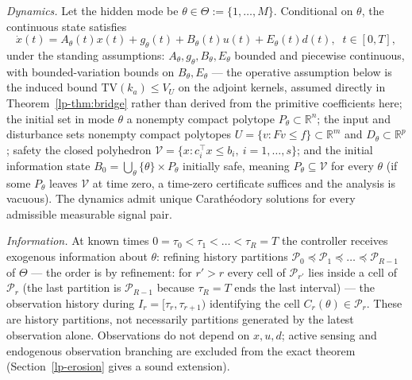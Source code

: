 \documentclass[10pt,twocolumn]{article}
\theoremstyle{plain}
\theoremstyle{definition}
\theoremstyle{remark}
\begin{document}
\emph{Dynamics.} Let the hidden mode be
\(\theta \in \Theta := \{1,\dots,M\}\). Conditional on \(\theta\), the
continuous state satisfies
\[
\dot x(t) = A_\theta(t)x(t) + g_\theta(t) + B_\theta(t)u(t) + E_\theta(t)d(t),
\;\; t \in [0,T],
\]
under the standing assumptions: \(A_\theta, g_\theta, B_\theta, E_\theta\)
bounded and piecewise continuous, with bounded-variation bounds on
\(B_\theta, E_\theta\) --- the operative assumption below is the induced
bound \(\mathrm{TV}(k_a) \le V_U\) on the adjoint kernels, assumed
directly in Theorem~\ref{lp-thm:bridge} rather than derived from the
primitive coefficients here; the initial set in mode \(\theta\) a nonempty compact
polytope \(P_\theta \subset \mathbb{R}^n\); the input and disturbance sets
nonempty compact polytopes \(U = \{v : Fv \le f\} \subset \mathbb{R}^m\) and
\(D_\theta \subset \mathbb{R}^p\); safety the closed polyhedron
\(\mathcal{V} = \{x : c_i^\top x \le b_i,\ i = 1,\dots,s\}\); and the initial
information state
\(B_0 = \bigcup_{\theta} \{\theta\} \times P_\theta\) initially safe,
meaning \(P_\theta \subseteq \mathcal{V}\) for every \(\theta\) (if some
\(P_\theta\) leaves \(\mathcal{V}\) at time zero, a time-zero certificate
suffices and the analysis is vacuous). The dynamics admit unique
Carath\'eodory solutions for every admissible measurable signal pair.

\emph{Information.} At known times
\(0 = \tau_0 < \tau_1 < \dots < \tau_R = T\) the controller receives
exogenous information about \(\theta\): refining history partitions
\(\mathcal{P}_0 \preceq \mathcal{P}_1 \preceq \dots \preceq \mathcal{P}_{R-1}\)
of \(\Theta\) --- the order is by refinement: for \(r' > r\) every cell of
\(\mathcal{P}_{r'}\) lies inside a cell of \(\mathcal{P}_r\) (the last
partition is \(\mathcal{P}_{R-1}\) because \(\tau_R = T\) ends the last
interval) --- the observation history during
\(I_r = [\tau_r, \tau_{r+1})\) identifying the cell \(C_r(\theta) \in
\mathcal{P}_r\). These are history partitions, not necessarily partitions
generated by the latest observation alone. Observations do not depend on
\(x, u, d\); active sensing and endogenous observation branching are excluded
from the exact theorem (Section~\ref{lp-erosion} gives a sound extension).
\end{document}
